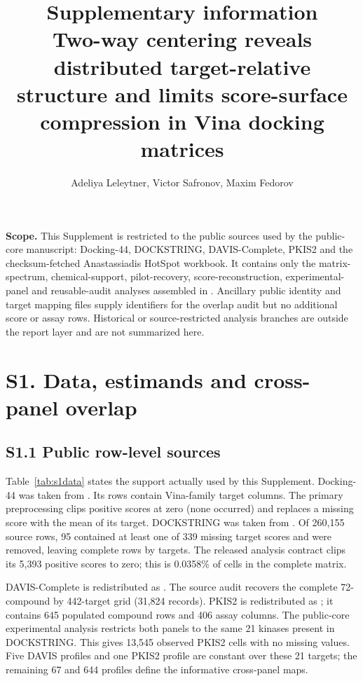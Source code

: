 \documentclass[11pt]{article}
\title{Supplementary information\\[4pt]
\large Two-way centering reveals distributed target-relative structure and
limits score-surface compression in Vina docking matrices}
\author{Adeliya Leleytner, Victor Safronov, Maxim Fedorov}
\date{}
\begin{document}
\maketitle

\noindent\textbf{Scope.}
This Supplement is restricted to the public sources used by the public-core
manuscript: Docking-44, DOCKSTRING, DAVIS-Complete, PKIS2 and the
checksum-fetched Anastassiadis HotSpot workbook. It contains only the
matrix-spectrum, chemical-support, pilot-recovery, score-reconstruction,
experimental-panel and reusable-audit analyses assembled in
. Ancillary public identity and target
mapping files supply identifiers for the overlap audit but no additional score
or assay rows. Historical or source-restricted analysis branches are outside
the report layer and are not summarized here.

\section*{S1. Data, estimands and cross-panel overlap}

\subsection*{S1.1 Public row-level sources}

Table~\ref{tab:s1data} states the support actually used by this Supplement.
Docking-44 was taken from 
\cite{nikitin2025}. Its \DffRows{} rows contain \DffTargets{} Vina-family
target columns. The primary preprocessing clips positive scores at zero (none
occurred) and replaces a missing score with the mean of its target. DOCKSTRING
was taken from 
\cite{dockstring2022}. Of 260,155 source rows, 95 contained at least one of 339
missing target scores and were removed, leaving \DsRows{} complete rows by
\DsTargets{} targets. The released analysis contract clips its 5,393 positive
scores to zero; this is 0.0358\% of cells in the complete matrix.

DAVIS-Complete is redistributed as
 \cite{davis2011,wu2025davis}. The
source audit recovers the complete 72-compound by 442-target grid (31,824
records). PKIS2 is redistributed as 
\cite{drewry2017}; it contains 645 populated compound rows and 406 assay
columns. The public-core experimental analysis restricts both panels to the
same 21 kinases present in DOCKSTRING. This gives 13,545 observed PKIS2 cells
with no missing values. Five DAVIS profiles and one PKIS2 profile are constant
over these 21 targets; the remaining 67 and 644 profiles define the
informative cross-panel maps.
\end{document}

